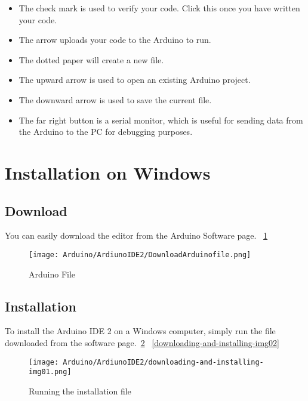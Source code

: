 \begin{itemize}
    \item	The check mark is used to verify your code. Click this once you have written your code.
    \item	The arrow uploads your code to the Arduino to run.
    \item	The dotted paper will create a new file.
    \item	The upward arrow is used to open an existing Arduino project.
    \item	The downward arrow is used to save the current file.
    \item	The far right button is a serial monitor, which is useful for sending data from the Arduino to the PC for debugging purposes.
\end{itemize}




\section{Installation on Windows}

\subsection{Download}
You can easily download the editor from the Arduino Software page. ~\ref{Download}
\begin{figure}
    \begin{center}
        \texttt{[image: Arduino/ArdiunoIDE2/DownloadArduinofile.png]}
        \caption{Arduino File}
        \label{Download}
    \end{center}
\end{figure}

\subsection{Installation}
To install the Arduino IDE 2 on a Windows computer, simply run the file downloaded from the software page.~\ref{downloading-and-installing-img01} ~\ref{downloading-and-installing-img02}
\begin{figure}
    \begin{center}
        \texttt{[image: Arduino/ArdiunoIDE2/downloading-and-installing-img01.png]}
        \caption{Running the installation file}
        \label{downloading-and-installing-img01}
    \end{center}
\end{figure}


